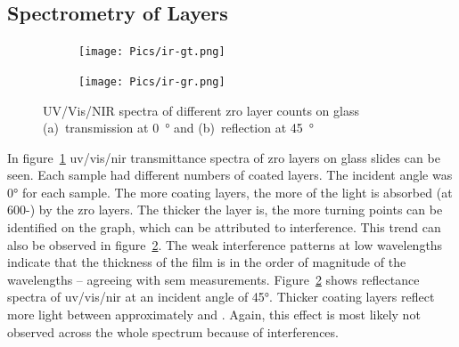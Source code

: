 \subsection{Spectrometry of  Layers}
\begin{figure}[htb]
    \centering
    \begin{subfigure}{.49\textwidth}
        \centering
        \texttt{[image: Pics/ir-gt.png]}
		\caption{}%
		\label{fig:ir-gt}
    \end{subfigure}
    \begin{subfigure}{.49\textwidth}
        \centering
        \texttt{[image: Pics/ir-gr.png]}
		\caption{}%
		\label{fig:ir-gr}
    \end{subfigure}
	\label{fig:ir}
	\caption{UV/Vis/NIR spectra of different \gls{zro} layer counts on glass 
	(a)~transmission at \SI{0}{\degree} and (b)~reflection at \SI{45}{\degree} 
	} 
\end{figure}

In figure~\ref{fig:ir-gt} \gls{uv}/\gls{vis}/\gls{nir} transmittance spectra of \gls{zro} layers on glass slides can be seen. 
Each sample had different numbers of coated layers. 
The incident angle was \ang{0} for each sample.
The more coating layers, the more of the light is absorbed (at 600-) by the \gls{zro} layers. 
The thicker the layer is, the more turning points can be identified on the graph, which can be attributed to interference\cite{Dumin1967}.
This trend can also be observed in figure~\ref{fig:ir-gr}.
The weak interference patterns at low wavelengths indicate that the thickness of the film is in the order of magnitude of the wavelengths\cite{delimafilho2017film} -- agreeing with \gls{sem} measurements. 
%
Figure~\ref{fig:ir-gr} shows reflectance spectra of \gls{uv}/\gls{vis}/\gls{nir} at an incident angle of \ang{45}. 
Thicker coating layers reflect more light between approximately  and . 
Again, this effect is most likely not observed across the whole spectrum because of interferences. 


